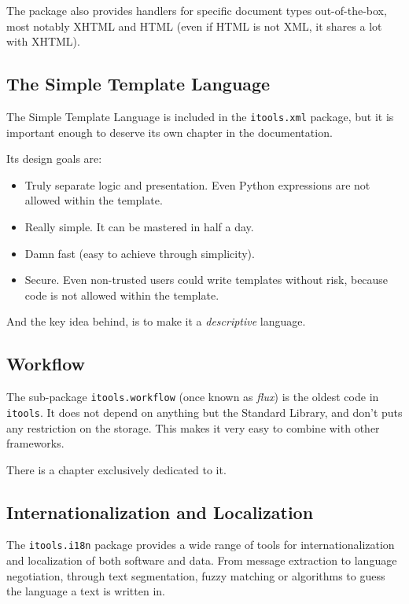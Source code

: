 The package also provides handlers for specific document types out-of-the-box,
most notably XHTML and HTML (even if HTML is not XML, it shares a lot with
XHTML).


\subsection{The Simple Template Language}

The Simple Template Language is included in the {\tt itools.xml} package,
but it is important enough to deserve its own chapter in the documentation.

Its design goals are:

\begin{itemize}
  \item Truly separate logic and presentation. Even Python expressions are
    not allowed within the template.

  \item Really simple. It can be mastered in half a day.

  \item Damn fast (easy to achieve through simplicity).

  \item Secure. Even non-trusted users could write templates without risk,
    because code is not allowed within the template.
\end{itemize}

And the key idea behind, is to make it a {\em descriptive} language.


\subsection{Workflow}

The sub-package {\tt itools.workflow} (once known as {\em flux}) is the
oldest code in {\tt itools}. It does not depend on anything but the
Standard Library, and don't puts any restriction on the storage. This
makes it very easy to combine with other frameworks.

There is a chapter exclusively dedicated to it.

\subsection{Internationalization and Localization}

The {\tt itools.i18n} package provides a wide range of tools for
internationalization and localization of both software and data. From
message extraction to language negotiation, through text segmentation,
fuzzy matching or algorithms to guess the language a text is written in.

